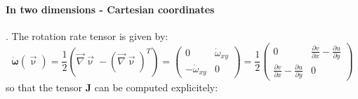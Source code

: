 \paragraph{In two dimensions - Cartesian coordinates}. 
The rotation rate tensor is given by:
\[
\dot{\bm \omega}(\vec\upnu) = \frac{1}{2}\left( \vec\nabla\vec \upnu - (\vec\nabla \vec\upnu)^T \right)
= 
\left( \begin{array}{cc}
0 & \dot{\omega}_{xy} \\
-\dot{\omega}_{xy} & 0
\end{array}\right)
=\frac{1}{2}
\left( \begin{array}{cc}
0 & \frac{\partial v}{\partial x} - \frac{\partial u}{\partial y} \\ 
\frac{\partial v}{\partial x} - \frac{\partial u}{\partial y} & 0 
\end{array}\right)
\]
so that the tensor ${\bm J}$ can be computed explicitely: 
